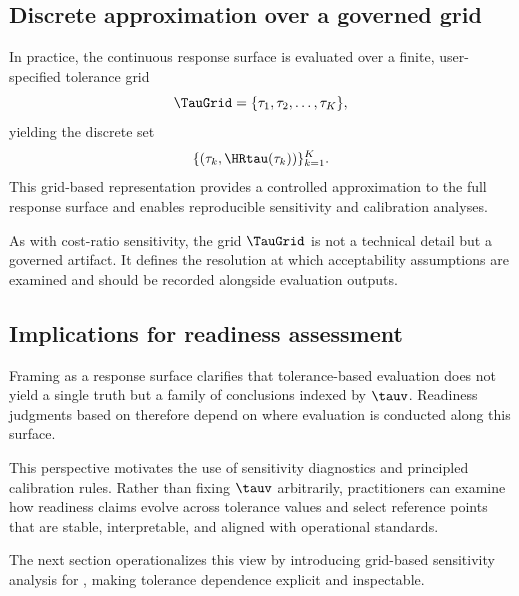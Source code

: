 \subsection{Discrete approximation over a governed grid}
\label{subsec:hrtau_grid}

In practice, the continuous response surface is evaluated over a finite,
user-specified tolerance grid
\[
    \TauGrid = \{\tau_1, \tau_2, \ldots, \tau_K\},
\]
yielding the discrete set
\[
    \{(\tau_k, \HRtau(\tau_k))\}_{k=1}^{K}.
\]
This grid-based representation provides a controlled approximation to the full
response surface and enables reproducible sensitivity and calibration analyses.

As with cost-ratio sensitivity, the grid $\TauGrid$ is not a technical detail but
a governed artifact.
It defines the resolution at which acceptability assumptions are examined and
should be recorded alongside evaluation outputs.



\subsection{Implications for readiness assessment}
\label{subsec:response_surface_readiness}

Framing \HRtau{} as a response surface clarifies that tolerance-based evaluation
does not yield a single truth but a family of conclusions indexed by $\tauv$.
Readiness judgments based on \HRtau{} therefore depend on where evaluation is
conducted along this surface.

This perspective motivates the use of sensitivity diagnostics and principled
calibration rules.
Rather than fixing $\tauv$ arbitrarily, practitioners can examine how readiness
claims evolve across tolerance values and select reference points that are stable,
interpretable, and aligned with operational standards.

The next section operationalizes this view by introducing grid-based sensitivity
analysis for \HRtau{}, making tolerance dependence explicit and inspectable.
